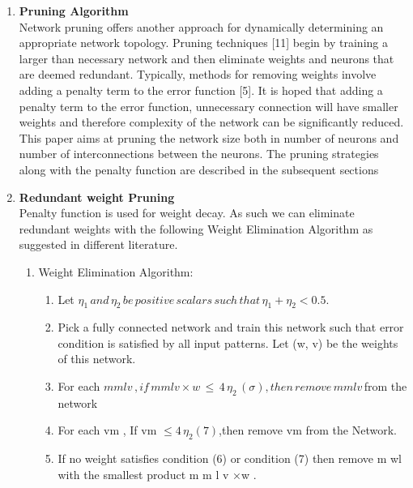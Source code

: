 \documentclass[a4paper,14pt,onecolumn]{article}
\begin{document}
\begin{enumerate}
\item \textbf{Pruning Algorithm}\\
Network pruning offers another approach for dynamically determining an appropriate network topology. Pruning techniques [11] begin by training a larger than necessary network and then eliminate weights and neurons that are deemed redundant. Typically, methods for removing weights involve adding a penalty term to the error function [5]. It is hoped that adding a penalty term to the error function, unnecessary connection will have smaller weights and therefore complexity of the network can be significantly reduced. This paper aims at pruning the network size both in number of neurons and number of interconnections between the neurons. The pruning strategies along with the penalty function are described in the subsequent sections

\item \textbf{Redundant weight Pruning}\\
Penalty function is used for weight decay. As such we can eliminate redundant weights   with the following Weight Elimination Algorithm as suggested in different literature.
   \begin{enumerate}
   \item Weight Elimination Algorithm:
          \begin{enumerate}
          \item Let \begin{math}\eta_1 \, and\, \eta_2\, be\, positive\, scalars\, such\, that\, \eta_1 + \eta_2 < 0.5.\end{math}
          \item Pick a fully connected network and train this network such that    
     error condition is satisfied by        
     all input patterns. Let (w, v) be the weights of this network.

          \item For each  \begin{math} m m l v \, , if\, m m l v ×w\, \leq \, 4 \,\eta_2 \, (\sigma) ,then\, remove\,  m m l v \, \end{math}from the network

          \item For each vm , If vm \begin{math}\leq 4 \,\eta_2 (7)\end{math},then remove vm from the Network.

          \item If no weight satisfies condition (6) or condition (7) then remove  
     m wl with the smallest product m m l v ×w .


\end{enumerate}
\end{enumerate}
\end{enumerate}
\end{document}
